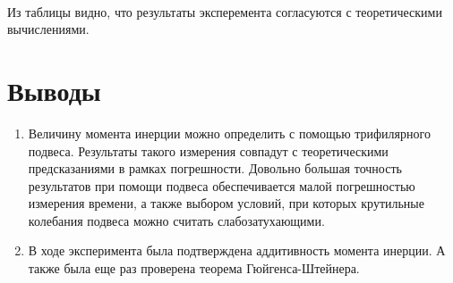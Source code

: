 \documentclass[a4paper,12pt]{article} %
\begin{document}
\

Из таблицы видно, что результаты эксперемента согласуются с теоретическими вычислениями.

\section{Выводы}
	\begin{enumerate}
		\item Величину момента инерции можно определить с помощью трифилярного подвеса. Результаты такого измерения совпадут с теоретическими предсказаниями в рамках погрешности. Довольно большая точность результатов при помощи подвеса обеспечивается малой погрешностью измерения времени, а также выбором условий, при которых крутильные колебания подвеса можно считать слабозатухающими.
		\item В ходе эксперимента была подтверждена аддитивность момента инерции. А также была еще раз проверена теорема Гюйгенса-Штейнера.
	\end{enumerate}
\end{document}
